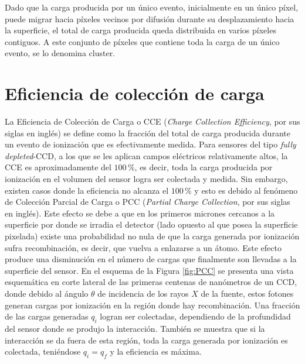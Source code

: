 Dado que la carga producida por un único evento, inicialmente en un único píxel, puede migrar hacia píxeles vecinos por difusión durante su desplazamiento hacia la superficie, el total de carga producida queda distribuida en varios píxeles contiguos. A este conjunto de píxeles que contiene toda la carga de un único evento, se lo denomina cluster.
\section{Eficiencia de colección de carga}
\noindent La Eficiencia de Colección de Carga o CCE (\textit{Charge Collection Efficiency}, por sus siglas en inglés) se define como la fracción del total de carga producida durante un evento de ionización que es efectivamente medida. 
Para sensores del tipo \textit{fully depleted}-CCD\cite{osti_838066}, a los que se les aplican campos eléctricos relativamente altos, la CCE es aproximadamente del $100\,\%$, es decir, toda la carga producida por ionización en el volumen del sensor logra ser colectada y medida. 
Sin embargo, existen casos donde la eficiencia no alcanza el $100\,\%$ y esto es debido al fenómeno de Colección Parcial de Carga o PCC (\textit{Partial Charge Collection}, por sus siglas en inglés)\cite{PCC-CCE}. 
Este efecto se debe a que en los primeros micrones cercanos a la superficie por donde se irradia el detector (lado opuesto al que posea la superficie pixelada) existe una probabilidad no nula de que la carga generada por ionización sufra recombinación, es decir, que vuelva a enlazarse a un átomo. Este efecto produce una disminución en el número de cargas que finalmente son llevadas a la superficie del sensor. 
En el esquema de la Figura \ref{fig:PCC} se presenta una vista esquemática en corte lateral de las primeras centenas de nanómetros de un CCD, donde debido al ángulo $\theta$ de incidencia de los rayos $X$ de la fuente, estos fotones generan cargas por ionización en la región donde hay recombinación. Una fracción de las cargas generadas $q_{i}$ logran ser colectadas, dependiendo de la profundidad del sensor donde se produjo la interacción. También se muestra que si la interacción se da fuera de esta región, toda la carga generada por ionización es colectada, teniéndose $q_{i} = q_{f}$ y la eficiencia es máxima.
